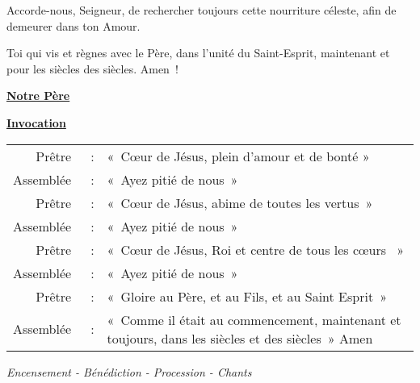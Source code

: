\documentclass[french,11pt,a4paper]{article}
\newcommand{\NewsItem}[1]{%
\vspace{3pt}
\underline{\textbf{#1}}
		  }
\begin{document}
Accorde-nous, Seigneur, de rechercher toujours cette nourriture céleste, afin de demeurer dans ton Amour.

Toi qui vis et règnes avec le Père, dans l’unité du Saint-Esprit, maintenant et pour les siècles des siècles. Amen !

\NewsItem{Notre Père}

\NewsItem{Invocation}

\begin{tabular}{rcp{10cm}}
Prêtre & : &		« Cœur de Jésus, plein d'amour et de bonté » \\
Assemblée & : &	« Ayez pitié de nous » \\
Prêtre & : &		« Cœur de Jésus, abime de toutes les vertus » \\
Assemblée & : &	« Ayez pitié de nous » \\
Prêtre & : &		« Cœur de Jésus, Roi et centre de tous les cœurs  » \\
Assemblée & : &	« Ayez pitié de nous » \\
Prêtre & : &		« Gloire au Père, et au Fils, et au Saint Esprit » \\
Assemblée & : &	« Comme il était au commencement, maintenant et toujours, dans les siècles et des siècles » Amen  \\
\end{tabular}

\emph{Encensement - Bénédiction - Procession - Chants}
\end{document}

